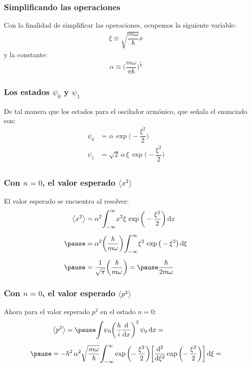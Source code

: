 \documentclass[12pt]{beamer}
\begin{document}
\begin{frame}
\frametitle{Simplificando las operaciones}
Con la finalidad de simplificar las operaciones, \pause ocupemos la siguiente variable:
\pause
\begin{align*}
\xi \equiv \sqrt{\dfrac{m \omega}{\hbar}} x
\end{align*}
\pause
y la constante:
\begin{align*}
\alpha \equiv \bigg( \dfrac{m \omega}{\pi \hbar} \bigg)^{\frac{1}{4}}
\end{align*}
\end{frame}
\begin{frame}
\frametitle{Los estados $\psi_{0}$ y $\psi_{1}$}
De tal manera que los estados para el oscilador armónico, que señala el enunciado son:
\pause
\begin{align*}
\psi_{0} &= \alpha \, \exp\bigg( - \dfrac{\xi^{2}}{2} \bigg) \\[0.5em]
\psi_{1} &= \sqrt{2} \, \alpha \, \xi \, \exp\bigg( - \dfrac{\xi^{2}}{2} \bigg) \\[0.5em]
\end{align*}
\end{frame}
\begin{frame}
\frametitle{Con $n = 0$, el valor esperado $\expval{x^{2}}$}
El valor esperado se encuentra al resolver:
\begin{eqnarray*}
\begin{aligned}
\expval{x^{2}} &= \alpha^{2} \scaleint{6ex}_{\bs -\infty}^{\infty} x^{2} \xi \, \exp\bigg( - \dfrac{\xi^{2}}{2} \bigg) \dd{x} \\[0.5em] \pause
&= \alpha^{2} \bigg( \dfrac{\hbar}{m \omega} \bigg) \scaleint{6ex}_{\bs -\infty}^{\infty} \xi^{2} \, \exp\big( - \xi^{2} \big) \dd{\xi} \\[0.5em] \pause
&= \dfrac{1}{\sqrt{\pi}} \bigg( \dfrac{\hbar}{m \omega} \bigg) = \pause \dfrac{\hbar}{2 m \omega}
\end{aligned}
\end{eqnarray*}
\end{frame}
\begin{frame}
\frametitle{Con $n = 0$, el valor esperado $\expval{p^{2}}$}
Ahora para el valor esperado $p^{2}$ en el estado $n = 0$:
\pause
\begin{eqnarray*}
\begin{aligned}
&\expval{p^{2}} = \pause \scaleint{6ex} \psi_{0} \bigg( \dfrac{h}{i} \dv{x} \bigg)^{2} \, \psi_{0} \dd{x} = \\[0.5em] \pause
&= - \hbar^{2} \, \alpha^{2} \sqrt{\dfrac{m \omega}{\hbar}} \scaleint{6ex}_{\bs - \infty}^{\infty} \exp\bigg( \!\!- \dfrac{\xi^{2}}{2} \bigg) \bigg[ \dv[2]{\xi} \exp\bigg( \!\! - \dfrac{\xi^{2}}{2} \bigg) \bigg]  \dd{\xi} =
\end{aligned}
\end{eqnarray*}
\end{frame}
\end{document}
